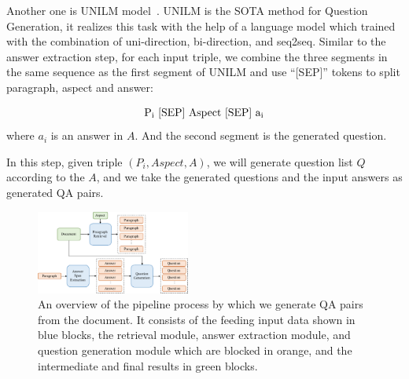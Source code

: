 Another one is UNILM model~\cite{dong2019unified}. UNILM is the SOTA method for Question Generation, it realizes this task with the help of a language model which trained with the combination of uni-direction, bi-direction, and seq2seq. Similar to the answer extraction step, for each input triple, we combine the three segments in the same sequence as the first segment of UNILM and use ``[SEP]'' tokens to split paragraph, aspect and answer:

\begin{equation*}
\begin{aligned}
{\rm P_i\ [SEP]\ Aspect\ [SEP]\ a_i}\\
\end{aligned}
\end{equation*}
where $a_i$ is an answer in $A$. And the second segment is the generated question.
 
In this step, given triple $(P_i, Aspect, A)$, we will generate question list $Q$ according to the $A$, and we take the generated questions and the input answers as generated QA pairs. 





\begin{figure}[th]
    \begin{center}
    \includegraphics[width=0.45\textwidth]{pic/pipeline.pdf}
        \caption{\label{fig:pipeline} An overview of the pipeline process by which we generate QA pairs from the document. It consists of the feeding input data shown in blue blocks, the retrieval module, answer extraction module, and question generation module which are blocked in orange, and the intermediate and final results in green blocks.}
    \end{center}
\end{figure}


